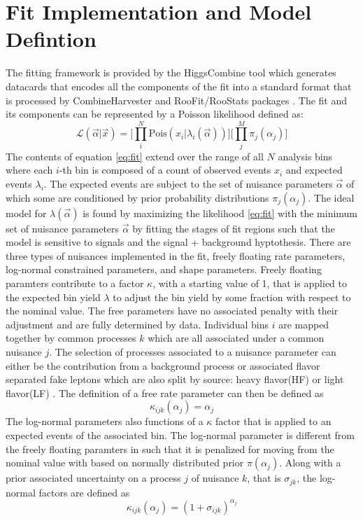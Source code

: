\section{Fit Implementation and Model Defintion}
The fitting framework is provided by the HiggsCombine tool which generates datacards that encodes all the components of the fit into a standard format that is processed by CombineHarvester and RooFit/RooStats packages \cite{Antcheva:2009zz}\cite{moneta2011roostats}. The fit and its components can be represented by a Poisson likelihood defined as:
\begin{equation}
\label{eq:fit}
\mathcal{L}(\vec{\alpha}|\vec{x}) = \bigg[ \prod_i^N \text{Pois}(x_i|\lambda_i(\vec{\alpha})) \bigg] \bigg[\prod_j^M \pi_j(\alpha_j) \bigg]
\end{equation}
The contents of equation \ref{eq:fit} extend over the range of all $N$ analysis bins where each $i$-th bin is composed of a count of observed events $x_i$ and expected events $\lambda_i$. The expected events are subject to the set of nuisance parameters $\vec{\alpha}$ of which some are conditioned by prior probability distributions $\pi_j(\alpha_j)$. The ideal model for $\lambda(\vec{\alpha})$ is found by maximizing the likelihood \ref{eq:fit} with the minimum set of nuisance parameters $\vec{\alpha}$ by fitting the stages of fit regions such that the model is sensitive to signals and the signal + background hyptothesis.  There are three types of nuisances implemented in the fit, freely floating rate parameters, log-normal constrained parameters, and shape parameters.  Freely floating paramters contribute to a factor $\kappa$, with a starting value of 1,  that is applied to the expected bin yield $\lambda$ to adjust the bin yield by some fraction with respect to the nominal value. The free parameters have no associated penalty with their adjustment and are fully determined by data. Individual bins $i$ are mapped together by common processes $k$ which are all associated under a common nuisance $j$. The selection of processes associated to a nuisance parameter can either be the contribution from a background process or associated flavor separated fake leptons which are also split by source: heavy flavor(HF) or light flavor(LF) . The definition of a free rate parameter can then be defined as 
\begin{equation}
\label{eq:rateparam}
\kappa_{ijk}(\alpha_j) = \alpha_j
\end{equation}  
The log-normal parameters also functions of a $\kappa$ factor that is applied to an expected events of the associated bin. The log-normal parameter is different from the freely floating paramters in such that it is penalized for moving from the nominal value with based on normally distributed prior $\pi(\alpha_j)$. Along with a prior associated uncertainty on a process $j$ of nuisance $k$, that is $\sigma_{jk}$, the log-normal factors are defined as
\begin{equation}
\label{eq:logparam}
\kappa_{ijk}(\alpha_j) = (1+\sigma_{ijk})^{\alpha_j}
\end{equation}

